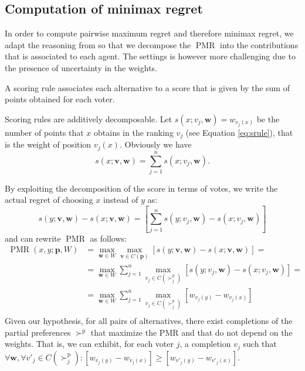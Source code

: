 \documentclass[12pt]{article}
\newcommand{\ppref}{\succ^\text{p}}%
\newcommand{\profile}{\textbf{v}}%
\newcommand{\pprofile}{\textbf{p}}%
\newcommand{\w}{\textbf{w}}%
\DeclareMathOperator{\PMR}{PMR}
\begin{document}
\subsection{Computation of minimax regret}
In order to compute pairwise maximum regret and therefore minimax regret, we adapt the reasoning from \cite{Lu2011} so that we decompose the $\PMR$ into the contributions that is associated to each agent.
The settings is however more challenging due to the presence of uncertainty in the weights.

A scoring rule associates each alternative to a score that is given by the sum of points obtained for each voter.

Scoring rules are additively decomposable.
Let $s(x; v_j,\w)=w_{v_j(x)}$ be the number of points that $x$ obtains in the ranking $v_j$ (see Equation \ref{eq:srule}), that is the weight of position $v_j(x)$.
Obviously we have 
\[ s(x; \profile, \w) = \sum_{j=1}^n s(x; v_j,\w). \]

By exploiting the decomposition of the score in terms of votes, we write the actual regret of choosing $x$ instead of $y$ as:
\[
s(y; \profile,\w) - s(x; \profile, \w) = [\sum_{j=1}^n s(y; v_j,\w) - s(x; v_j,\w)]
\]
and  can rewrite $\PMR$ as follows:
\begin{align*}
\PMR(x,y; \pprofile, W) &= \max_{\w \in W} \max_{\profile \in C(\pprofile)} [ s(y; \profile,\w) - s(x; \profile,\w) ] = \\
&=  \max_{\w \in W} \sum_{j=1}^{n} \max_{v_j \in C(\succ_j^p)} [s(y; v_j,\w) - s(x; v_j,\w)]=\\
&=  \max_{\w \in W} \sum_{j=1}^{n} \max_{v_j \in C(\succ_j^p)} [w_{v_j(y)} - w_{v_j(x)}] \\
\end{align*}
Given our hypothesis, for all pairs of alternatives, there exist completions of the partial preferences $\ppref$ that maximize the PMR and that do not depend on the weights. 
That is, we can exhibit, for each voter $j$, a completion $v_j$ such that $\forall \w, \forall v'_j \in C(\ppref_j): [w_{v_j(y)} - w_{v_j(x)}] \geq [w_{v'_j(y)} - w_{v'_j(x)}]$.
\end{document}
